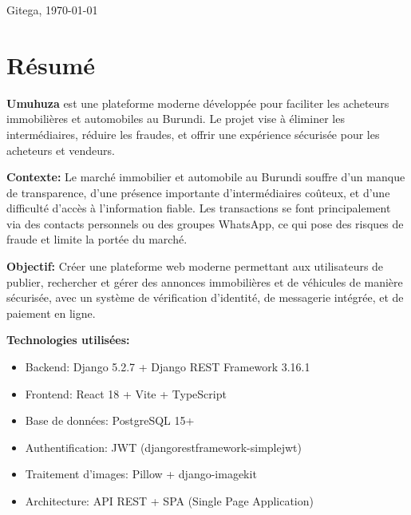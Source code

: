 \documentclass[12pt,a4paper]{report}
\begin{document}
\begin{titlepage}
\begin{center}
        \vspace{1cm}

        {\large Gitega, \today}

    \end{center}
\end{titlepage}

\chapter*{Résumé}

\textbf{Umuhuza} est une plateforme moderne développée pour faciliter les acheteurs immobilières et automobiles au Burundi. Le projet vise à éliminer les intermédiaires, réduire les fraudes, et offrir une expérience sécurisée pour les acheteurs et vendeurs.

\vspace{0.5cm}

\textbf{Contexte:} Le marché immobilier et automobile au Burundi souffre d'un manque de transparence, d'une présence importante d'intermédiaires coûteux, et d'une difficulté d'accès à l'information fiable. Les transactions se font principalement via des contacts personnels ou des groupes WhatsApp, ce qui pose des risques de fraude et limite la portée du marché.

\vspace{0.5cm}

\textbf{Objectif:} Créer une plateforme web moderne permettant aux utilisateurs de publier, rechercher et gérer des annonces immobilières et de véhicules de manière sécurisée, avec un système de vérification d'identité, de messagerie intégrée, et de paiement en ligne.

\vspace{0.5cm}

\textbf{Technologies utilisées:}
\begin{itemize}[noitemsep]
    \item Backend: Django 5.2.7 + Django REST Framework 3.16.1
    \item Frontend: React 18 + Vite + TypeScript
    \item Base de données: PostgreSQL 15+
    \item Authentification: JWT (djangorestframework-simplejwt)
    \item Traitement d'images: Pillow + django-imagekit
    \item Architecture: API REST + SPA (Single Page Application)
\end{itemize}
\end{document}
